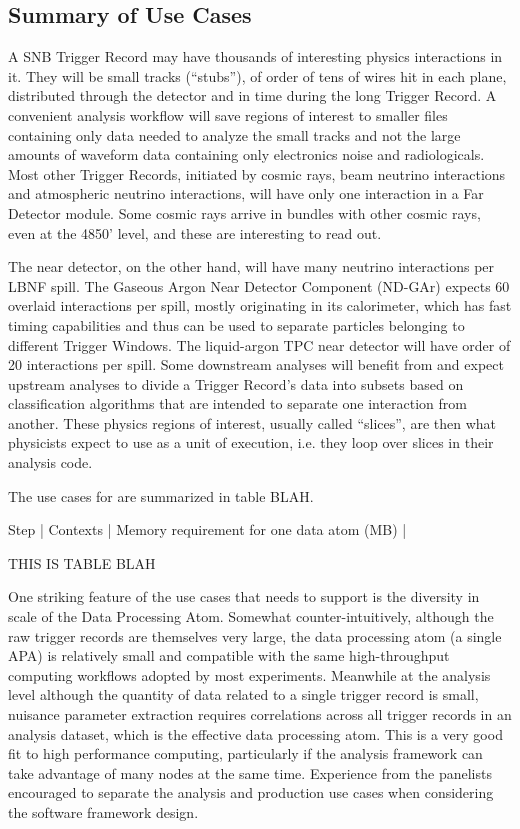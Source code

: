 \documentclass[../main-v1.tex]{subfiles}
\begin{document}
\subsection{Summary of Use Cases}


A SNB Trigger Record may have thousands of interesting physics interactions in it.  They will be small tracks (“stubs”), of order of tens of wires hit in each plane, distributed through the detector and in time during the long Trigger Record.  A convenient analysis workflow will save regions of interest to smaller files containing only data needed to analyze the small tracks and not the large amounts of waveform data containing only electronics noise and radiologicals.  Most other Trigger Records, initiated by cosmic rays, beam neutrino interactions and atmospheric neutrino interactions, will have only one interaction in a Far Detector module.  Some cosmic rays arrive in bundles with other cosmic rays, even at the 4850’ level, and these are interesting to read out.

The near detector, on the other hand, will have many neutrino interactions per LBNF spill.  The Gaseous Argon Near Detector Component (ND-GAr) expects 60 overlaid interactions per spill, mostly originating in its calorimeter, which has fast timing capabilities and thus can be used to separate particles belonging to different Trigger Windows.  The liquid-argon TPC near detector will have order of 20 interactions per spill.  Some downstream analyses will benefit from and expect upstream analyses to divide a Trigger Record’s data into subsets based on classification algorithms that are intended to separate one interaction from another.  These physics regions of interest, usually called “slices”, are then what physicists expect to use as a unit of execution, i.e. they loop over slices in their analysis code.


The use cases for  are summarized in table BLAH.

Step | Contexts | Memory requirement for one data atom (MB) |

THIS IS TABLE BLAH


One striking feature of the use cases that  needs to support is the diversity in scale of the Data Processing Atom.  Somewhat counter-intuitively, although the raw trigger records are themselves very large, the data processing atom (a single APA) is relatively small and compatible with the same high-throughput computing workflows adopted by most  experiments.  Meanwhile at the analysis level although the quantity of data related to a single trigger record is small, nuisance parameter extraction requires correlations across all trigger records in an analysis dataset, which is the effective data processing atom.  This is a very good fit to high performance computing, particularly if the analysis framework can take advantage of many  nodes at the same time. Experience from the  panelists encouraged  to separate the analysis and production use cases when considering the software framework design.
\end{document}

